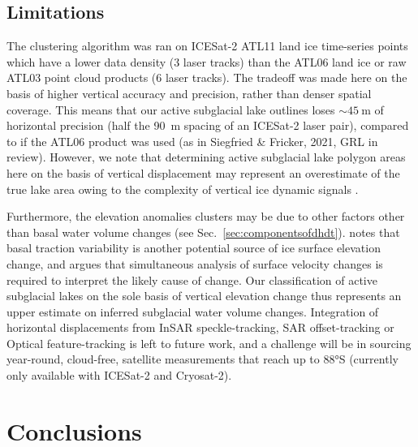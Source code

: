 \subsection{Limitations}

The clustering algorithm was ran on ICESat-2 ATL11 land ice time-series \citep{SmithATLASICESat2L3B2021} points which have a lower data density (3 laser tracks) than the ATL06 land ice \citep{SmithATLASICESat2L3A2020} or raw ATL03 \citep{NeumannATLASICESat2L2A2020} point cloud products (6 laser tracks).
The tradeoff was made here on the basis of higher vertical accuracy and precision, rather than denser spatial coverage.
This means that our active subglacial lake outlines loses $\sim\SI{45}{\metre}$ of horizontal precision (half the \SI{90}{\metre} spacing of an ICESat-2 laser pair), compared to if the ATL06 product was used (as in Siegfried \& Fricker, 2021, GRL in review). %
However, we note that determining active subglacial lake polygon areas here on the basis of vertical displacement may represent an overestimate of the true lake area owing to the complexity of vertical ice dynamic signals \citep[c.f.][]{SergienkoCausessuddenshortterm2007,LiRadarSoundingConfirms2020}.

Furthermore, the elevation anomalies clusters may be due to other factors other than basal water volume changes (see Sec.~\ref{sec:componentsofdhdt}).
\citet{SergienkoCausessuddenshortterm2007} notes that basal traction variability is another potential source of ice surface elevation change, and argues that simultaneous analysis of surface velocity changes \citep[e.g.][]{SiegfriedEpisodicicevelocity2016} is required to interpret the likely cause of change.
Our classification of active subglacial lakes on the sole basis of vertical elevation change thus represents an upper estimate on inferred subglacial water volume changes.
Integration of horizontal displacements from InSAR speckle-tracking, SAR offset-tracking or Optical feature-tracking \citep[e.g.][]{GardnerIncreasedWestAntarctic2018} is left to future work, and a challenge will be in sourcing year-round, cloud-free, satellite measurements that reach up to 88°S (currently only available with ICESat-2 and Cryosat-2).

\section{Conclusions}

